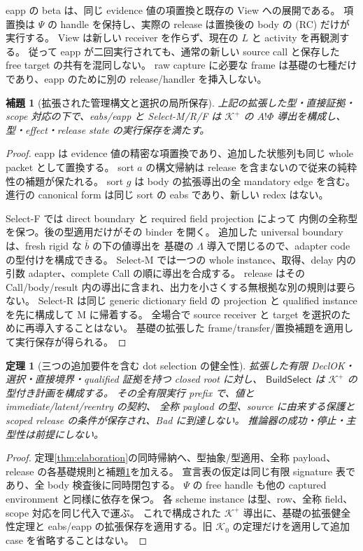 \documentclass[11pt,a4paper]{article}
\newtheorem{lemma}[definition]{補題}
\newtheorem{theorem}[definition]{定理}
\newcommand{\Core}{\mathcal K}
\begin{document}
eapp の beta は、同じ evidence 値の項置換と既存の View への展開である。
項置換は \(\Psi\) の handle を保持し、実際の release は置換後の body の (RC) だけが実行する。
View は新しい receiver を作らず、現在の \(L\) と activity を再観測する。
従って eapp が二回実行されても、通常の新しい source call と保存した free target の共有を混同しない。
raw capture に必要な frame は基礎の七種だけであり、eapp のために別の release/handler を挿入しない。

\begin{lemma}[拡張された管理構文と選択の局所保存]
\label{lem:extended-select}
上記の拡張した型・直接証拠・scope 対応の下で、eabs/eapp と Select-M/R/F は
\(\Core^+\) の \(A!\Phi\) 導出を構成し、型・effect・release state の実行保存を満たす。
\end{lemma}
\begin{proof}
eapp は evidence 値の精密な項置換であり、追加した状態列も同じ whole packet として置換する。
sort \(a\) の構文帰納は release を含まないので従来の純粋性の補題が保たれる。
sort \(g\) は body の拡張導出の全 mandatory edge を含む。
進行の canonical form は同じ sort の eabs であり、新しい redex はない。

Select-F では direct boundary と required field projection によって
内側の全称型を保つ。後の型適用だけがその binder を開く。
追加した universal boundary は、fresh rigid な \(\bar b\) の下の値導出を
基礎の \(\Lambda\) 導入で閉じるので、adapter code の型付けを構成できる。
Select-M では一つの whole instance、取得、delay 内の引数 adapter、complete Call の順に導出を合成する。
release はその Call/body/result 内の導出に含まれ、出力を小さくする無根拠な別の規則は要らない。
Select-R は同じ generic dictionary field の projection と qualified instance を先に構成して M に帰着する。
全場合で source receiver と target を選択のために再導入することはない。
基礎の拡張した frame/transfer/置換補題を適用して実行保存が得られる。
\end{proof}

\begin{theorem}[三つの追加要件を含む dot selection の健全性]
\label{thm:extended-selection}
拡張した有限 DeclOK・選択・直接境界・qualified 証拠を持つ closed root に対し、
\(\mathsf{BuildSelect}\) は \(\Core^+\) の型付き計画を構成する。
その全有限実行 prefix で、値と immediate/latent/reentry の契約、
全称 payload の型、source に由来する保護と scoped release の条件が保存され、Bad に到達しない。
推論器の成功・停止・主型性は前提にしない。
\end{theorem}
\begin{proof}
定理\ref{thm:elaboration}の同時帰納へ、型抽象/型適用、全称 payload、
release の各基礎規則と補題\ref{lem:extended-select}を加える。
宣言表の仮定は同じ有限 signature 表であり、全 body 検査後に同時閉包する。
\(\Psi\) の free handle も他の captured environment と同様に依存を保つ。
各 scheme instance は型、row、全称 field、scope 対応を同じ代入で運ぶ。
これで構成された \(\Core^+\) 導出に、基礎の拡張健全性定理と
eabs/eapp の拡張保存を適用する。旧 \(\Core_0\) の定理だけを適用して追加 case を省略することはない。
\end{proof}
\end{document}
